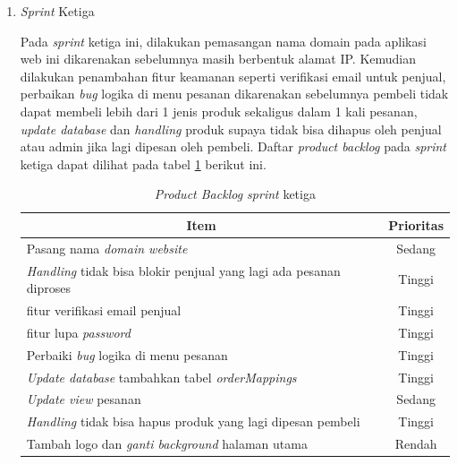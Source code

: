 \begin{enumerate}
	\item \textit{Sprint} Ketiga
	\par Pada \textit{sprint} ketiga ini, dilakukan pemasangan nama domain pada aplikasi web ini dikarenakan sebelumnya masih berbentuk alamat IP. Kemudian dilakukan penambahan fitur keamanan seperti verifikasi email untuk penjual, perbaikan \textit{bug} logika di menu pesanan dikarenakan sebelumnya pembeli tidak dapat membeli lebih dari 1 jenis produk sekaligus dalam 1 kali pesanan, \textit{update database} dan \textit{handling} produk supaya tidak bisa dihapus oleh penjual atau admin jika lagi dipesan oleh pembeli. Daftar \textit{product backlog} pada \textit{sprint} ketiga dapat dilihat pada tabel \ref*{tab:sprint ketiga} berikut ini.
	

	

	\begin{table}[H]
		\begin{center}
		\caption{\textit{Product Backlog sprint} ketiga}
		\label{tab:sprint ketiga}
		\begin{tabular}{|l|c|}
		\hline
		\multicolumn{1}{|c|}{Item} & Prioritas\\
		\hline
		Pasang nama \textit{domain website} & Sedang\\
		\hline
		\textit{Handling} tidak bisa blokir penjual yang lagi ada pesanan diproses & Tinggi\\
		\hline
		fitur verifikasi email penjual & Tinggi\\
		\hline
		fitur lupa \textit{password} & Tinggi\\
		\hline
		Perbaiki \textit{bug} logika di menu pesanan & Tinggi\\
		\hline
		\textit{Update database} tambahkan tabel \textit{orderMappings} & Tinggi\\
		\hline
		\textit{Update view} pesanan & Sedang\\
		\hline
		\textit{Handling} tidak bisa hapus produk yang lagi dipesan pembeli & Tinggi\\
		\hline
		Tambah logo dan \textit{ganti background} halaman utama & Rendah\\
		\hline
		\end{tabular}
		\end{center}
	\end{table}


\end{enumerate}
